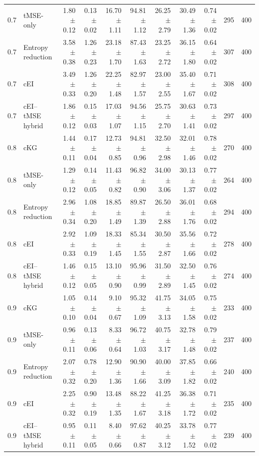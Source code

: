 \begin{tabular}{@{}clrrrrrrrrr@{}}
0.7 & tMSE-only & 1.80 $\pm$ 0.12 & 0.13 $\pm$ 0.02 & 16.70 $\pm$ 1.11 & 94.81 $\pm$ 1.12 & 26.25 $\pm$ 2.79 & 30.49 $\pm$ 1.36 & 0.74 $\pm$ 0.02 & 295 & 400 \\
0.7 & Entropy reduction & 3.58 $\pm$ 0.38 & 1.26 $\pm$ 0.23 & 23.18 $\pm$ 1.70 & 87.43 $\pm$ 1.63 & 23.25 $\pm$ 2.72 & 36.15 $\pm$ 1.80 & 0.64 $\pm$ 0.02 & 307 & 400 \\
0.7 & cEI & 3.49 $\pm$ 0.33 & 1.26 $\pm$ 0.20 & 22.25 $\pm$ 1.48 & 82.97 $\pm$ 1.57 & 23.00 $\pm$ 2.55 & 35.40 $\pm$ 1.67 & 0.71 $\pm$ 0.02 & 308 & 400 \\
0.7 & cEI--tMSE hybrid & 1.86 $\pm$ 0.12 & 0.15 $\pm$ 0.03 & 17.03 $\pm$ 1.07 & 94.56 $\pm$ 1.15 & 25.75 $\pm$ 2.70 & 30.63 $\pm$ 1.41 & 0.73 $\pm$ 0.02 & 297 & 400 \\
0.8 & cKG & 1.44 $\pm$ 0.11 & 0.17 $\pm$ 0.04 & 12.73 $\pm$ 0.85 & 94.81 $\pm$ 0.96 & 32.50 $\pm$ 2.98 & 32.01 $\pm$ 1.46 & 0.78 $\pm$ 0.02 & 270 & 400 \\
0.8 & tMSE-only & 1.29 $\pm$ 0.12 & 0.14 $\pm$ 0.05 & 11.43 $\pm$ 0.82 & 96.82 $\pm$ 0.90 & 34.00 $\pm$ 3.06 & 30.13 $\pm$ 1.37 & 0.77 $\pm$ 0.02 & 264 & 400 \\
0.8 & Entropy reduction & 2.96 $\pm$ 0.34 & 1.08 $\pm$ 0.20 & 18.85 $\pm$ 1.49 & 89.87 $\pm$ 1.39 & 26.50 $\pm$ 2.88 & 36.01 $\pm$ 1.76 & 0.68 $\pm$ 0.02 & 294 & 400 \\
0.8 & cEI & 2.92 $\pm$ 0.33 & 1.09 $\pm$ 0.19 & 18.33 $\pm$ 1.45 & 85.34 $\pm$ 1.55 & 30.50 $\pm$ 2.87 & 35.56 $\pm$ 1.66 & 0.72 $\pm$ 0.02 & 278 & 400 \\
0.8 & cEI--tMSE hybrid & 1.46 $\pm$ 0.12 & 0.15 $\pm$ 0.05 & 13.10 $\pm$ 0.90 & 95.96 $\pm$ 0.99 & 31.50 $\pm$ 2.89 & 32.50 $\pm$ 1.45 & 0.76 $\pm$ 0.02 & 274 & 400 \\
0.9 & cKG & 1.05 $\pm$ 0.10 & 0.14 $\pm$ 0.04 & 9.10 $\pm$ 0.67 & 95.32 $\pm$ 1.09 & 41.75 $\pm$ 3.13 & 34.05 $\pm$ 1.58 & 0.75 $\pm$ 0.02 & 233 & 400 \\
0.9 & tMSE-only & 0.96 $\pm$ 0.11 & 0.13 $\pm$ 0.06 & 8.33 $\pm$ 0.64 & 96.72 $\pm$ 1.03 & 40.75 $\pm$ 3.17 & 32.78 $\pm$ 1.48 & 0.79 $\pm$ 0.02 & 237 & 400 \\
0.9 & Entropy reduction & 2.07 $\pm$ 0.32 & 0.78 $\pm$ 0.20 & 12.90 $\pm$ 1.36 & 90.90 $\pm$ 1.66 & 40.00 $\pm$ 3.09 & 37.85 $\pm$ 1.82 & 0.66 $\pm$ 0.02 & 240 & 400 \\
0.9 & cEI & 2.25 $\pm$ 0.32 & 0.90 $\pm$ 0.19 & 13.48 $\pm$ 1.35 & 88.22 $\pm$ 1.67 & 41.25 $\pm$ 3.18 & 36.38 $\pm$ 1.72 & 0.71 $\pm$ 0.02 & 235 & 400 \\
0.9 & cEI--tMSE hybrid & 0.95 $\pm$ 0.11 & 0.11 $\pm$ 0.05 & 8.40 $\pm$ 0.66 & 97.62 $\pm$ 0.87 & 40.25 $\pm$ 3.12 & 33.78 $\pm$ 1.52 & 0.77 $\pm$ 0.02 & 239 & 400 \\
\bottomrule
\end{tabular}

\endgroup